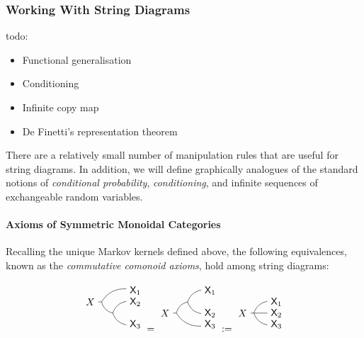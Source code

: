 
\subsubsection{Working With String Diagrams}

todo:
\begin{itemize}
\item Functional generalisation
\item Conditioning
\item Infinite copy map
\item De Finetti's representation theorem
\end{itemize}

There are a relatively small number of manipulation rules that are useful for string diagrams. In addition, we will define graphically analogues of the standard notions of \emph{conditional probability}, \emph{conditioning}, and infinite sequences of exchangeable random variables.

\paragraph{Axioms of Symmetric Monoidal Categories}

Recalling the unique Markov kernels defined above, the following equivalences, known as the \emph{commutative comonoid axioms}, hold among string diagrams:

\begin{align}
	\begin{tikzpicture}[scale=0.8]
	\path (0,0) node (X) {$X$} 
	++ (0.5,0) coordinate (copy0)
	+ (1.5,0.5) node (X1) {$\RV{X}_1$}
	++ (0.5,-0.5) coordinate (copy1)
	+(1,0.5) node (X2) {$\RV{X}_2$}
	+(1,-0.5) node (X3) {$\RV{X}_3$};
	\draw (X) -- (copy0) to [bend left] (X1) (copy0) to [bend right] (copy1) to [bend left] (X2) (copy1) to [bend right] (X3);
	\end{tikzpicture}
	=
	\begin{tikzpicture}[scale=0.8]
	\path (0,0) node (X) {$X$} 
	++ (0.5,0) coordinate (copy0)
	+ (1.5,-0.5) node (X1) {$\RV{X}_3$}
	++ (0.5,0.5) coordinate (copy1)
	+(1,0.5) node (X2) {$\RV{X}_1$}
	+(1,-0.5) node (X3) {$\RV{X}_2$};
	\draw (X) -- (copy0) to [bend right] (X1) (copy0) to [bend left] (copy1) to [bend left] (X2) (copy1) to [bend right] (X3);
	\end{tikzpicture}
	:=
	\begin{tikzpicture}[scale=0.8]
	\path (0,0) node (X) {$X$} 
	++ (0.5,0) coordinate (copy0)
	+ (1,0.5) node (X1) {$\RV{X}_1$}
	+(1,0) node (X2) {$\RV{X}_2$}
	+(1,-0.5) node (X3) {$\RV{X}_3$};
	\draw (X) -- (copy0) to [bend left] (X1) (copy0) to (X2) (copy0) to [bend right] (X3);
	\end{tikzpicture}\label{eq:ccom1}
\end{align}

